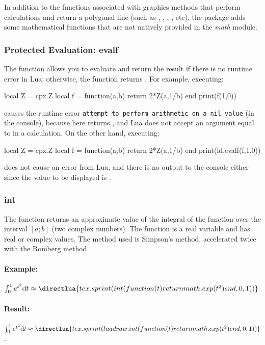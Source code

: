 In addition to the functions associated with graphics methods that perform calculations and return a polygonal line (such as , , , , etc), the \luadrawenv package adds some mathematical functions that are not natively provided in the \emph{math} module.

\subsubsection{Protected Evaluation: evalf}
The  function allows you to evaluate  and return the result if there is no runtime error in Lua; otherwise, the function returns \nil. For example, executing:
\begin{Luacode}
local Z = cpx.Z
local f = function(a,b)
    return 2*Z(a,1/b)
end
print(f(1,0))
\end{Luacode}
causes the runtime error \verb|attempt to perform arithmetic on a nil value| (in the console), because here  returns \nil, and Lua does not accept an argument equal to \nil in a calculation. On the other hand, executing:
\begin{Luacode}
local Z = cpx.Z
local f = function(a,b)
    return 2*Z(a,1/b)
end
print(ld.evalf(f,1,0))
\end{Luacode}
does not cause an error from Lua, and there is no output to the console either since the value to be displayed is \nil.

\subsubsection{int}
The function  returns an approximate value of the integral of the function  over the interval $[a;b]$ (two complex numbers). The function  is a real variable and has real or complex values. The method used is Simpson's method, accelerated twice with the Romberg method.

\paragraph{Example:}
\begin{TeXcode}
$\int_0^1 e^{t^2}\mathrm d t \approx \directlua{tex.sprint(int(function(t) return math.exp(t^2) end, 0, 1))}$
\end{TeXcode}
\paragraph{Result:} $\int_0^1 e^{t^2}\mathrm d t \approx \directlua{tex.sprint(luadraw.int(function(t) return math.exp(t^2) end, 0, 1))}$.


